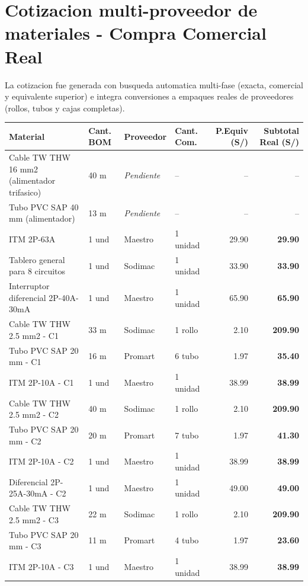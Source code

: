 \section{Cotizacion multi-proveedor de materiales - Compra Comercial Real}

La cotizacion fue generada con busqueda automatica multi-fase (exacta, comercial y equivalente superior) e integra conversiones a empaques reales de proveedores (rollos, tubos y cajas completas).

\begin{longtable}{p{5.0cm} p{1.5cm} p{2.2cm} p{2.2cm} r r}
\toprule
\textbf{Material} & \textbf{Cant. BOM} & \textbf{Proveedor} & \textbf{Cant. Com.} & \textbf{P.Equiv (S/)} & \textbf{Subtotal Real (S/)} \\
\midrule
Cable TW THW 16 mm2 (alimentador trifasico) & 40 m & \textit{Pendiente} & -- & -- & -- \\
Tubo PVC SAP 40 mm (alimentador) & 13 m & \textit{Pendiente} & -- & -- & -- \\
ITM 2P-63A & 1 und & Maestro & 1 unidad & 29.90 & \textbf{29.90} \\
Tablero general para 8 circuitos & 1 und & Sodimac & 1 unidad & 33.90 & \textbf{33.90} \\
Interruptor diferencial 2P-40A-30mA & 1 und & Maestro & 1 unidad & 65.90 & \textbf{65.90} \\
Cable TW THW 2.5 mm2 - C1 & 33 m & Sodimac & 1 rollo & 2.10 & \textbf{209.90} \\
Tubo PVC SAP 20 mm - C1 & 16 m & Promart & 6 tubo & 1.97 & \textbf{35.40} \\
ITM 2P-10A - C1 & 1 und & Maestro & 1 unidad & 38.99 & \textbf{38.99} \\
Cable TW THW 2.5 mm2 - C2 & 40 m & Sodimac & 1 rollo & 2.10 & \textbf{209.90} \\
Tubo PVC SAP 20 mm - C2 & 20 m & Promart & 7 tubo & 1.97 & \textbf{41.30} \\
ITM 2P-10A - C2 & 1 und & Maestro & 1 unidad & 38.99 & \textbf{38.99} \\
Diferencial 2P-25A-30mA - C2 & 1 und & Maestro & 1 unidad & 49.00 & \textbf{49.00} \\
Cable TW THW 2.5 mm2 - C3 & 22 m & Sodimac & 1 rollo & 2.10 & \textbf{209.90} \\
Tubo PVC SAP 20 mm - C3 & 11 m & Promart & 4 tubo & 1.97 & \textbf{23.60} \\
ITM 2P-10A - C3 & 1 und & Maestro & 1 unidad & 38.99 & \textbf{38.99} \\

\end{longtable}

